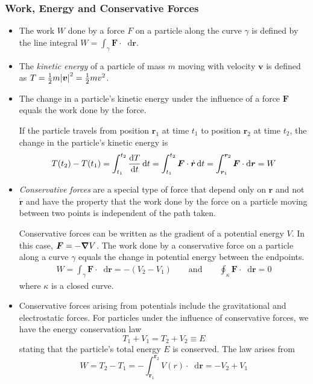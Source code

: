 \documentclass[11pt, a4paper]{article}
\newcommand{\diff}{\mathop{}\!\mathrm{d}} %
\begin{document}
\subsubsection{Work, Energy and Conservative Forces}
\begin{itemize}
	\item The work $ W $ done by a force $ F $ on a particle along the curve $ \gamma $ is defined by the line integral $ W = \int_{\gamma} \bm{F} \cdot \diff \bm{r} $.
	
	\item The \textit{kinetic energy} of a particle of mass $ m $ moving with velocity $ \bm{v} $ is defined as $ T = \frac{1}{2}m \abs{\bm{v}}^2 = \frac{1}{2}m v^2$.
	
	
	\item The change in a particle's kinetic energy under the influence of a force $ \bm{F} $ equals the work done by the force.
	
	If the particle travels from position $ \bm{r}_1 $ at time $ t_1 $	to position $ \bm{r}_2 $ at time $ t_2 $, the change in the particle's kinetic energy is
	\begin{equation*}
		T(t_2) - T(t_1) = \int_{t_1}^{t_2} \dv{T}{t} \diff t = \int_{t_1}^{t_2} \bm{F} \cdot \dot{\bm{r}} \diff t = \int_{\bm{r}_1}^{\bm{r}_2} \bm{F} \cdot \diff \bm{r} = W
	\end{equation*}
	
	\item \textit{Conservative forces} are a special type of force that depend only on $ \bm{r} $ and not $ \dot{\bm{r}} $ and have the property that the work done by the force on a particle moving between two points is independent of the path taken.
	
	Conservative forces can be written as the gradient of a potential energy $ V $. In this case, $ \bm{F} = - \grad{V} $. The work done by a conservative force on a particle along a curve $ \gamma $ equals the change in potential energy between the endpoints.
	\begin{align*}
		W = \int_{\gamma} \bm{F} \cdot \diff \bm{r} = - (V_2 - V_1) \qquad \text{and} \qquad \oint_{\kappa} \bm{F} \cdot \diff \bm{r} = 0
	\end{align*}
	where $ \kappa $ is a closed curve.
	
	\item Conservative forces arising from potentials include the gravitational and electrostatic forces. For particles under the influence of conservative forces, we have the energy conservation law
	\begin{equation*}
		T_1 + V_1 = T_2 + V_2 \equiv E
	\end{equation*}
	stating that the particle's total energy $ E $ is conserved. The law arises from
	\begin{equation*}
		W = T_2 - T_1 = - \int_{\bm{r}_1}^{\bm{r}_2} V(r) \cdot \diff \bm{r} = -V_2 + V_1
	\end{equation*}
\end{itemize}
\end{document}
